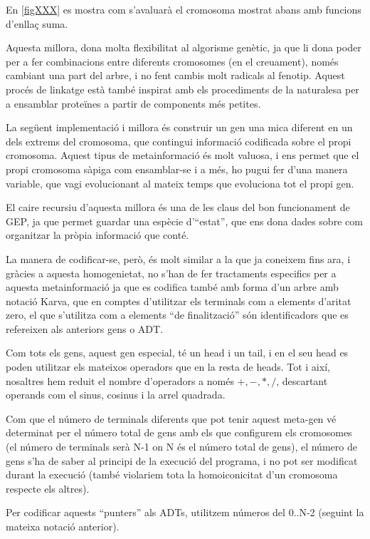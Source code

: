 \documentclass[titlepage,a4paper,12pt]{book}
\begin{document}
En \ref{figXXX} es mostra com s'avaluarà el cromosoma mostrat abans amb funcions
d'enllaç suma.

Aquesta millora, dona molta flexibilitat al algorisme genètic, ja que li dona
poder per a fer combinacions entre diferents cromosomes (en el creuament), només
cambiant una part del arbre, i no fent cambis molt radicals al fenotip.  Aquest
procés de linkatge està també inspirat amb els procediments de la naturalesa per
a ensamblar proteïnes a partir de components més petites.

La següent implementació i millora és construir un gen una mica diferent en un
dels extrems del cromosoma, que contingui informació codificada sobre el propi
cromosoma.  Aquest tipus de metainformació és molt valuosa, i ens permet que el
propi cromosoma sàpiga com ensamblar-se i a més, ho pugui fer d'una manera
variable, que vagi evolucionant al mateix temps que evoluciona tot el propi gen.

El caire recursiu d'aquesta millora és una de les claus del bon funcionament de
GEP, ja que permet guardar una espècie d'``estat'', que ens dona dades sobre com
organitzar la pròpia informació que conté.

La manera de codificar-se, però, és molt similar a la que ja coneixem fins ara,
i gràcies a aquesta homogenietat, no s'han de fer tractaments especifics per a
aquesta metainformació ja que es codifica també amb forma d'un arbre amb notació
Karva, que en comptes d'utilitzar els terminals com a elements d'aritat zero, el
que s'utilitza com a elements ``de finalització'' són identificadors que es
refereixen als anteriors gens o ADT.

Com tots els gens, aquest gen especial, té un head i un tail, i en el seu head
es poden utilitzar els mateixos operadors que en la resta de heads.  Tot i així,
nosaltres hem reduit el nombre d'operadors a només $+,-,*,/$, descartant
operands com el sinus, cosinus i la arrel quadrada.

Com que el número de terminals diferents que pot tenir aquest meta-gen vé
determinat per el número total de gens amb els que configurem els cromosomes (el
número de terminals serà N-1 on N és el número total de gens), el número de gens
s'ha de saber al principi de la execució del programa, i no pot ser modificat
durant la execució (també violariem tota la homoiconicitat  d'un cromosoma respecte
els altres).

Per codificar aquests ``punters'' als ADTs, utilitzem números del 0..N-2
(seguint la mateixa notació anterior).
\end{document}
